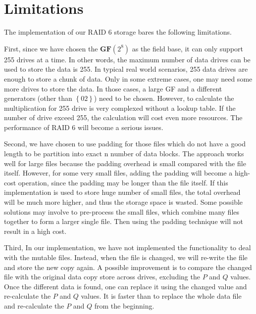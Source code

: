 \section{Limitations}

The implementation of our RAID 6 storage bares the following limitations. 

First, since we have chosen the $\mathbf{GF}(2^8)$ as the field base, it can only support 255 drives at a time. In other words, the maximum number of data drives can be used to store the data is 255. In typical real world scenarios, 255 data drives are enough to store a chunk of data. Only in some extreme cases, one may need some more drives to store the data. In those cases, a large GF and a different generators (other than $\left\{02\right\}$) need to be chosen. However, to calculate the multiplication for 255 drive is very complexed without a lookup table. If the number of drive exceed 255, the calculation will cost even more resources. The performance of RAID 6 will become a serious issues.

Second, we have chosen to use padding for those files which do not have a good length to be partition into exact n number of data blocks. The approach works well for large files because the padding overhead is small compared with the file itself. However, for some very small files, adding the padding will become a high-cost operation, since the padding may be longer than the file itself. If this implementation is used to store huge number of small files, the total overhead will be much more higher, and thus the storage space is wasted. Some possible solutions may involve to pre-process the small files, which combine many files together to form a larger single file. Then using the padding technique will not result in a high cost.

Third, In our implementation, we have not implemented the functionality to deal with the mutable files. Instead, when the file is changed, we will re-write the file and store the new copy again. A possible improvement is to compare the changed file with the original data copy store across drives, excluding the $P$ and $Q$ values. Once the different data is found, one can replace it using the changed value and re-calculate the $P$ and $Q$ values. It is faster than to replace the whole data file and re-calculate the $P$ and $Q$ from the beginning.
